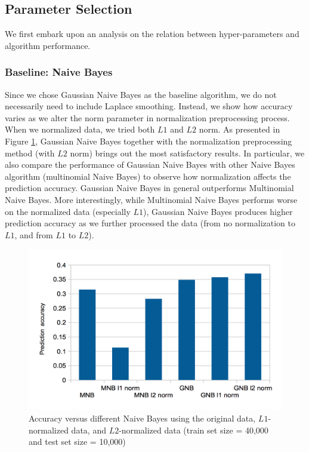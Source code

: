 \documentclass{acm_proc_article-sp}
\begin{document}
\subsection{Parameter Selection}
We first embark upon an analysis on the relation between hyper-parameters and algorithm performance.
 
\subsubsection{Baseline: Naive Bayes}
Since we chose Gaussian Naive Bayes as the baseline algorithm, we do not necessarily need to include Laplace smoothing. Instead, we show how accuracy varies as we alter the norm parameter in normalization preprocessing process. When we normalized data, we tried both $L1$ and $L2$ norm.  As presented in  Figure \ref{fig:gnbparam}, Gaussian Naive Bayes together with the normalization preprocessing method (with $L2$ norm) brings out the most satisfactory results.   In particular, we also compare the performance of Gaussian Naive Bayes with other Naive Bayes algorithm (multinomial Naive Bayes) to  observe how normalization affects the prediction accuracy. Gaussian Naive Bayes in general outperforms Multinomial Naive Bayes. More interestingly,  while Multinomial Naive Bayes performs worse on the normalized data (especially $L1$),  Gaussian Naive Bayes produces higher prediction accuracy as we further processed the data (from no normalization to $L1$, and from $L1$ to $L2$).
\begin{figure} 
\centering
\includegraphics[width=0.9\columnwidth]{graphs/gnb_param.png}  
\caption{Accuracy versus different Naive Bayes using the original data, $L1$-normalized data, and $L2$-normalized data (train set size = 40,000 and test set size = 10,000)}
\label{fig:gnbparam}
\end{figure}
\end{document}
